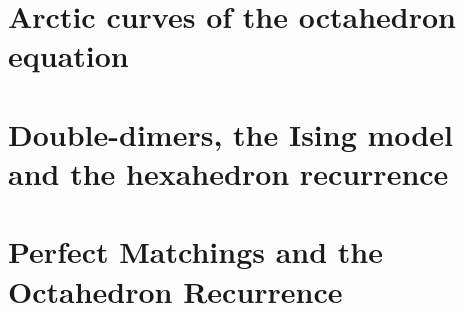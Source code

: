 \section{Arctic curves of the octahedron equation \cite{di2014arctic}}


\section{Double-dimers, the Ising model and the hexahedron recurrence \cite{kenyon2013double}}

\section{Perfect Matchings and the Octahedron Recurrence \cite{speyer2004perfect}}

